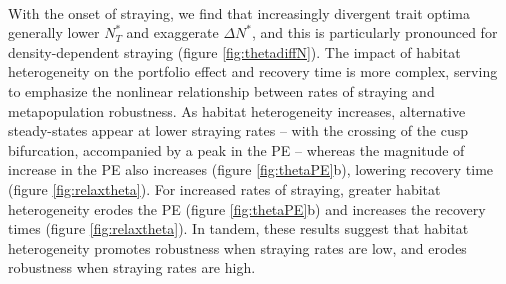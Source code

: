 \documentclass{revtex4}
\begin{document}
\\ 
\noindent With the onset of straying, we find that increasingly divergent trait optima generally lower $N_T^*$ and exaggerate $\Delta N^*$, and this is particularly pronounced for density-dependent straying (figure \ref{fig:thetadiffN}). %
The impact of habitat heterogeneity on the portfolio effect and recovery time is more complex, serving to emphasize the nonlinear relationship between rates of straying and metapopulation robustness. %
As habitat heterogeneity increases, alternative steady-states appear at lower straying rates -- with the crossing of the cusp bifurcation, accompanied by a peak in the PE -- whereas the magnitude of increase in the PE also increases (figure \ref{fig:thetaPE}b), lowering recovery time (figure \ref{fig:relaxtheta}).
For increased rates of straying, greater habitat heterogeneity erodes the PE (figure \ref{fig:thetaPE}b) and increases the recovery times (figure \ref{fig:relaxtheta}).
In tandem, these results suggest that habitat heterogeneity promotes robustness when straying rates are low, and erodes robustness when straying rates are high.
\end{document}
